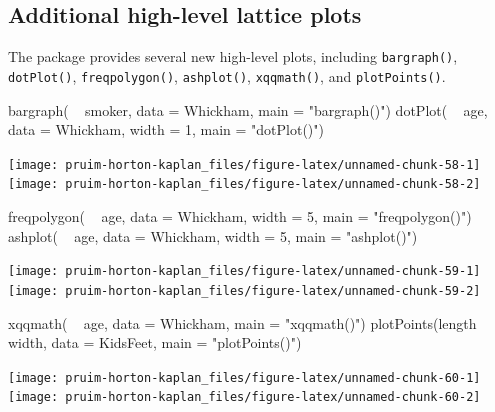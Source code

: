 \subsection{Additional high-level lattice
plots}\label{additional-high-level-lattice-plots}

The  package provides several new high-level 
plots, including \texttt{bargraph()}, \texttt{dotPlot()},
\texttt{freqpolygon()}, \texttt{ashplot()}, \texttt{xqqmath()}, and
\texttt{plotPoints()}.

\begin{Schunk}
\begin{Sinput}
bargraph( ~ smoker, data = Whickham, main = "bargraph()")
dotPlot( ~ age, data = Whickham, width = 1, main = "dotPlot()")
\end{Sinput}


\begin{center}\texttt{[image: pruim-horton-kaplan\_files/figure-latex/unnamed-chunk-58-1]} \texttt{[image: pruim-horton-kaplan\_files/figure-latex/unnamed-chunk-58-2]} \end{center}

\end{Schunk}\begin{Schunk}
\begin{Sinput}
freqpolygon( ~ age, data = Whickham, width = 5, main = "freqpolygon()")
ashplot( ~ age, data = Whickham, width = 5, main = "ashplot()")
\end{Sinput}


\begin{center}\texttt{[image: pruim-horton-kaplan\_files/figure-latex/unnamed-chunk-59-1]} \texttt{[image: pruim-horton-kaplan\_files/figure-latex/unnamed-chunk-59-2]} \end{center}

\end{Schunk}\begin{Schunk}
\begin{Sinput}
xqqmath( ~ age, data = Whickham, main = "xqqmath()")
plotPoints(length ~ width, data = KidsFeet, main = "plotPoints()")
\end{Sinput}


\begin{center}\texttt{[image: pruim-horton-kaplan\_files/figure-latex/unnamed-chunk-60-1]} \texttt{[image: pruim-horton-kaplan\_files/figure-latex/unnamed-chunk-60-2]} \end{center}

\end{Schunk}

